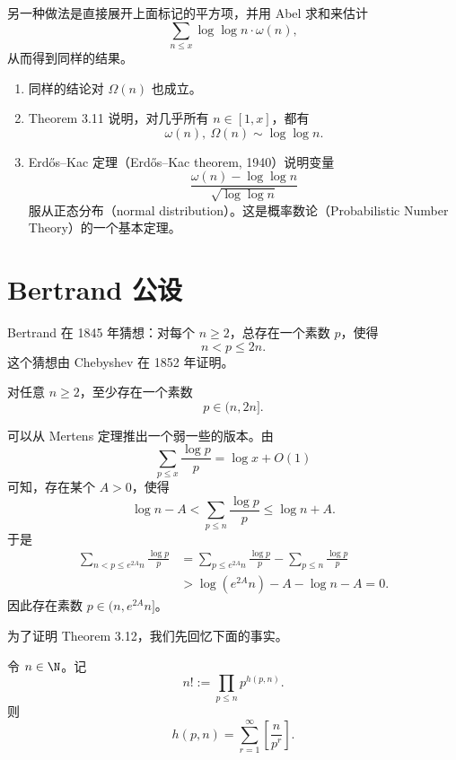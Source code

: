\begin{remark}
	另一种做法是直接展开上面标记的平方项，并用 Abel 求和来估计
	\[
		\sum_{n\leq x}\log\log n\cdot \omega(n),
	\]
	从而得到同样的结果。
\end{remark}

\begin{remark}
	\begin{enumerate}[label=(\alph*)]
		\item 同样的结论对 $\Omega(n)$ 也成立。
		\item Theorem 3.11 说明，对几乎所有 $n\in[1,x]$，都有
		\[
			\omega(n),\ \Omega(n)\sim \log\log n.
		\]
		\item Erdős--Kac 定理（Erdős--Kac theorem, 1940）说明变量
		\[
			\frac{\omega(n)-\log\log n}{\sqrt{\log\log n}}
		\]
		服从正态分布（normal distribution）。这是概率数论（Probabilistic Number Theory）的一个基本定理。
	\end{enumerate}
\end{remark}

\section{Bertrand 公设}

Bertrand 在 1845 年猜想：对每个 $n\geq 2$，总存在一个素数 $p$，使得
\[
	n<p\leq 2n.
\]
这个猜想由 Chebyshev 在 1852 年证明。

\begin{theorem}
	对任意 $n\geq 2$，至少存在一个素数
	\[
		p\in(n,2n].
	\]
\end{theorem}

\begin{remark}
	可以从 Mertens 定理推出一个弱一些的版本。由
	\[
		\sum_{p\leq x}\frac{\log p}{p}=\log x+O(1)
	\]
	可知，存在某个 $A>0$，使得
	\[
		\log n-A
		<
		\sum_{p\leq n}\frac{\log p}{p}
		\leq
		\log n+A.
	\]
	于是
	\[
	\begin{aligned}
		\sum_{n<p\leq e^{2A}n}\frac{\log p}{p}
		&=
		\sum_{p\leq e^{2A}n}\frac{\log p}{p}
		-
		\sum_{p\leq n}\frac{\log p}{p}\\
		&>
		\log(e^{2A}n)-A-\log n-A
		=
		0.
	\end{aligned}
	\]
	因此存在素数 $p\in(n,e^{2A}n]$。
\end{remark}

为了证明 Theorem 3.12，我们先回忆下面的事实。

\begin{lemma}[原文 Lemma 3.13]
	令 $n\in\N$。记
	\[
		n!:=\prod_{p\leq n}p^{h(p,n)}.
	\]
	则
	\[
		h(p,n)=\sum_{r=1}^{\infty}\left[\frac{n}{p^r}\right].
	\]
\end{lemma}

